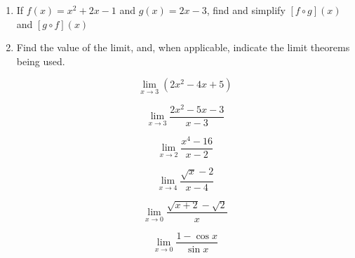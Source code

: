 \documentclass{exam}
\def\ans#1{\hfill \textcolor{lightgray}{#1}}
\begin{document}
\begin{enumerate}
\item
If $f(x)=x^{2}+2x-1$ and $g(x)=2x-3$, find and simplify $\left[f\circ g\right](x)$ and $\left[g\circ f\right](x)$

\vfill




\newpage
%

\item
Find the value of the limit, and, when applicable, indicate the limit theorems being used.  %

\begin{minipage}{.5\linewidth}
\begin{equation*}
 \lim_{x\to3} (2x^{2}-4x+5)
\end{equation*}
\end{minipage}%
\begin{minipage}{.5\linewidth}
\begin{equation*}
 \lim_{x\to 3} \frac{2x^{2}-5x-3}{x-3}
\end{equation*}
\end{minipage}



\vfill

\begin{minipage}{.5\linewidth}
\begin{equation*}
 \lim_{x\to 2} \frac{x^{4}-16}{x-2}
\end{equation*}
\end{minipage}%
\begin{minipage}{.5\linewidth}
\begin{equation*}
\lim_{x\to 4} \frac{\sqrt{x}-2}{x-4}
\end{equation*}
\end{minipage}
\vfill


\begin{minipage}{.5\linewidth}
\begin{equation*}
 \lim_{x\to0} \frac{\sqrt{x+2}-\sqrt{2}}{x}
\end{equation*}
\end{minipage}%
\begin{minipage}{.5\linewidth}
\begin{equation*}
 \lim_{x\to0} \frac{1-\cos{x}}{\sin{x}}
\end{equation*}
\end{minipage}
\vfill



\end{enumerate}
\end{document}
